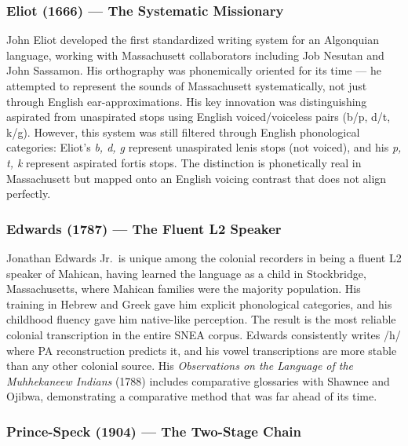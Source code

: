 \subsubsection{Eliot (1666) --- The Systematic Missionary}

John Eliot developed the first standardized writing system for an Algonquian
language, working with Massachusett collaborators including Job Nesutan and
John Sassamon. His orthography was phonemically oriented for its time --- he
attempted to represent the sounds of Massachusett systematically, not just
through English ear-approximations. His key innovation was distinguishing
aspirated from unaspirated stops using English voiced/voiceless pairs (b/p,
d/t, k/g). However, this system was still filtered through English
phonological categories: Eliot's \textit{b, d, g} represent unaspirated lenis
stops (not voiced), and his \textit{p, t, k} represent aspirated fortis
stops. The distinction is phonetically real in Massachusett but mapped onto
an English voicing contrast that does not align perfectly.

\subsubsection{Edwards (1787) --- The Fluent L2 Speaker}

Jonathan Edwards Jr.\ is unique among the colonial recorders in being a
fluent L2 speaker of Mahican, having learned the language as a child in
Stockbridge, Massachusetts, where Mahican families were the majority
population. His training in Hebrew and Greek gave him explicit phonological
categories, and his childhood fluency gave him native-like perception. The
result is the most reliable colonial transcription in the entire SNEA corpus.
Edwards consistently writes /h/ where PA reconstruction predicts it, and his
vowel transcriptions are more stable than any other colonial source. His
\textit{Observations on the Language of the Muhhekaneew Indians} (1788)
includes comparative glossaries with Shawnee and Ojibwa, demonstrating a
comparative method that was far ahead of its time.

\subsubsection{Prince-Speck (1904) --- The Two-Stage Chain}

